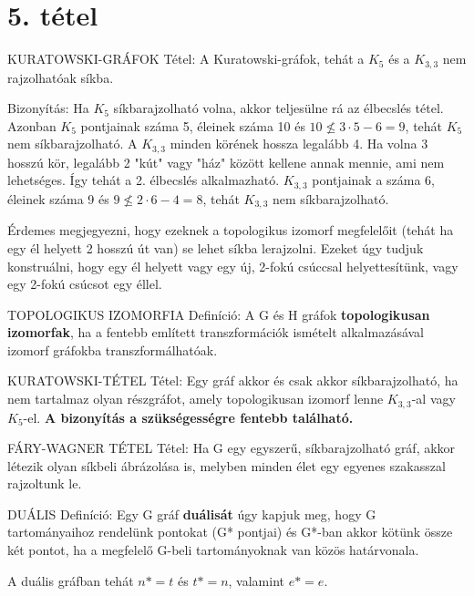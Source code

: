 \section{5. tétel}

\begin{framed}
KURATOWSKI-GRÁFOK Tétel: A Kuratowski-gráfok, tehát a $K_5$ és a $K_{3,3}$ nem rajzolhatóak síkba.
\end{framed}
\begin{leftbar}
Bizonyítás: Ha $K_5$ síkbarajzolható volna, akkor teljesülne rá az élbecslés tétel. Azonban $K_5$ pontjainak száma 5, éleinek száma 10 és $10 \not\leq 3 \cdot 5 -6 = 9$, tehát $K_5$ nem síkbarajzolható.
A $K_{3,3}$ minden körének hossza legalább 4. Ha volna 3 hosszú kör, legalább 2 "kút" vagy "ház" között kellene annak mennie, ami nem lehetséges. Így tehát a 2. élbecslés alkalmazható. $K_{3,3}$ pontjainak a száma 6, éleinek száma 9 és $9 \not\leq 2 \cdot 6 - 4 = 8$, tehát $K_{3,3}$ nem síkbarajzolható.
\end{leftbar}
Érdemes megjegyezni, hogy ezeknek a topologikus izomorf megfelelőit (tehát ha egy él helyett 2 hosszú út van) se lehet síkba lerajzolni. Ezeket úgy tudjuk konstruálni, hogy egy él helyett vagy egy új, 2-fokú csúccsal helyettesítünk, vagy egy 2-fokú csúcsot egy éllel.
\begin{shaded}
TOPOLOGIKUS IZOMORFIA Definíció: A G és H gráfok \textbf{topologikusan izomorfak}, ha a fentebb említett transzformációk ismételt alkalmazásával izomorf gráfokba transzformálhatóak.
\end{shaded}
\begin{framed}
KURATOWSKI-TÉTEL Tétel: Egy gráf akkor és csak akkor síkbarajzolható, ha nem tartalmaz olyan részgráfot, amely topologikusan izomorf lenne $K_{3,3}$-al vagy $K_5$-el. \textbf{A bizonyítás a szükségességre fentebb található.}
\end{framed}
\begin{framed}
FÁRY-WAGNER TÉTEL Tétel: Ha G egy egyszerű, síkbarajzolható gráf, akkor létezik olyan síkbeli ábrázolása is, melyben minden élet egy egyenes szakasszal rajzoltunk le.
\end{framed}
\begin{shaded}
DUÁLIS Definíció: Egy G gráf \textbf{duálisát} úgy kapjuk meg, hogy G tartományaihoz rendelünk pontokat (G* pontjai) és G*-ban akkor kötünk össze két pontot, ha a megfelelő G-beli tartományoknak van közös határvonala.
\end{shaded}
A duális gráfban tehát $n* = t$ és $t* = n$, valamint $e* = e$.
